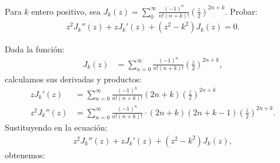 \begin{homeworkProblem}
  Para $k$ entero positivo, sea $J_k(z) = \sum_{0}^{\infty} \frac{(-1)^n}{n! (n+k)!} \left( \frac{z}{2} \right)^{2n+k}$. Probar:
  \begin{align*}
    z^2 J_k''(z) + zJ_k'(z) + (z^2 - k^2) J_k(z) = 0.   
  \end{align*}
  \begin{solution}
    Dada la función:
    \begin{align*}
      J_k(z) &= \sum_{n=0}^{\infty} \frac{(-1)^n}{n! (n+k)!} \left( \frac{z}{2} \right)^{2n+k},
    \end{align*}
    calculamos sus derivadas y productos:
    \begin{align*}
      zJ_k'(z) &= \sum_{n=0}^{\infty} \frac{(-1)^n}{n! (n+k)!} (2n+k)\left( \frac{z}{2} \right)^{2n+k} \\
      z^2J_k''(z) &= \sum_{n=0}^{\infty} \frac{(-1)^n}{n! (n+k)!} \cdot (2n+k)(2n+k-1) \left( \frac{z}{2} \right)^{2n+k}.
    \end{align*}
    Sustituyendo en la ecuación:
    \begin{align*}
      z^2 J_k''(z) + z J_k'(z) + (z^2 - k^2) J_k(z),
    \end{align*}
    obtenemos:
  \end{solution}
\end{homeworkProblem}
